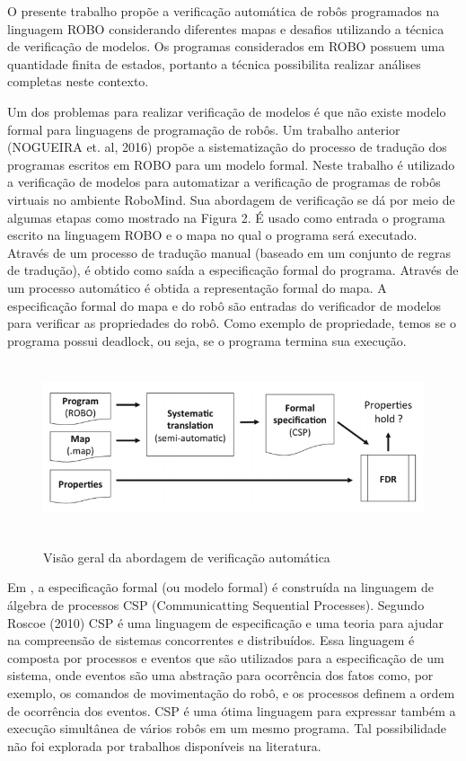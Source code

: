 O presente trabalho propõe a verificação automática de robôs programados na linguagem ROBO considerando diferentes mapas e desafios utilizando a técnica de verificação de modelos. Os programas considerados em ROBO possuem uma quantidade finita de estados, portanto a técnica possibilita realizar análises completas neste contexto.

Um dos problemas para realizar verificação de modelos é que não existe modelo formal para linguagens de programação de robôs. Um trabalho anterior (NOGUEIRA et. al, 2016) propõe a sistematização do processo de tradução dos programas escritos em ROBO para um modelo formal.  Neste trabalho é utilizado a verificação de modelos para automatizar a verificação de programas de robôs virtuais no ambiente RoboMind. Sua abordagem de verificação se dá por meio de algumas etapas como mostrado na Figura 2. É usado como entrada o programa escrito na linguagem ROBO e o mapa no qual o programa será executado. Através de um processo de tradução manual (baseado em um conjunto de regras de tradução), é obtido como saída a especificação formal do programa. Através de um processo automático é obtida a representação formal do mapa. A especificação formal do mapa e do robô são entradas do verificador de modelos para verificar as propriedades do robô. Como exemplo de propriedade, temos se o programa possui deadlock, ou seja, se o programa termina sua execução. 

\begin{figure}[h]
\centering
\includegraphics[height=5cm]{figuras/approach_workflow.png}
\caption{Visão geral da abordagem de verificação automática}
\label{fig:fluxograma}
\cite{nogueira}
\end{figure} 

Em \cite{nogueira}, a especificação formal (ou modelo formal) é construída na linguagem de álgebra de processos CSP (Communicatting Sequential Processes). Segundo Roscoe (2010) CSP é uma linguagem de especificação e uma teoria para ajudar na compreensão de sistemas concorrentes e distribuídos. Essa linguagem é composta por processos e eventos que são utilizados para a especificação de um sistema, onde eventos são uma abstração para ocorrência dos fatos como, por exemplo, os comandos de movimentação do robô, e os processos definem a ordem de ocorrência dos eventos. CSP é uma ótima linguagem para expressar também a execução simultânea de vários robôs em um mesmo programa. Tal possibilidade não foi explorada por trabalhos disponíveis na literatura.

